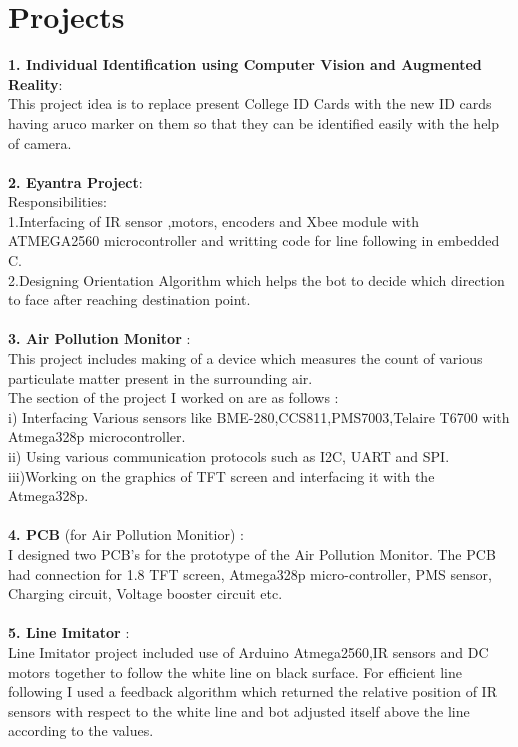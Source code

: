 \documentclass[11pt]{article}
\begin{document}
\section{Projects}
\textbf{1. Individual Identification using Computer Vision and Augmented Reality}:\\
This project idea is to replace present College ID Cards with the new ID cards having aruco marker on them so that they can be identified easily with the help of camera.\\\\
\textbf{2. Eyantra Project}:\\
 Responsibilities:\\
1.Interfacing of IR sensor ,motors, encoders and Xbee module with ATMEGA2560 microcontroller and writting code for line following in embedded C.\\
2.Designing Orientation Algorithm which helps the bot to decide which direction to face after reaching destination point.\\\\
\textbf{3. Air Pollution Monitor} :\\
 This project includes making of a device which measures the count of various particulate matter  present in the surrounding air.\\
The section of the project I worked on are as follows :\\
i)  Interfacing Various sensors like BME-280,CCS811,PMS7003,Telaire T6700 with Atmega328p microcontroller.\\
ii) Using various communication protocols such as I2C, UART and SPI.\\
iii)Working on the graphics of TFT screen and interfacing it with the Atmega328p.\\\\
\textbf{4. PCB }(for Air Pollution Monitior) :\\
I designed two PCB's for the prototype of the Air Pollution Monitor. The PCB had connection for 1.8 TFT screen, Atmega328p micro-controller, PMS sensor, Charging circuit, Voltage booster circuit etc.\\\\
\textbf{5. Line Imitator} :\\
Line Imitator project included use of Arduino Atmega2560,IR sensors and DC motors together to follow the white line on black surface. For efficient line following I used a feedback algorithm which returned the relative position of IR sensors with respect to the white line and bot adjusted itself above the line according to the values.\\\\
\end{document}
